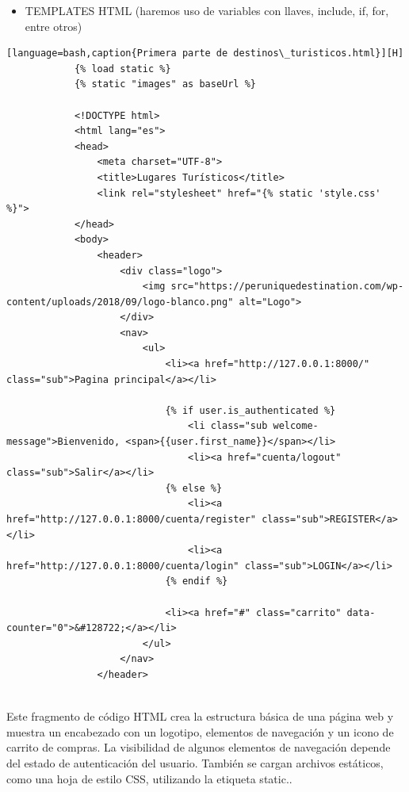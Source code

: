 \documentclass{article}
\begin{document}
        \begin{itemize}	
		\item TEMPLATES HTML (haremos uso de variables con llaves, include, if, for, entre otros)
	\end{itemize}
	\begin{lstlisting}[language=bash,caption{Primera parte de destinos\_turisticos.html}][H]
            {% load static %}
            {% static "images" as baseUrl %}
            
            <!DOCTYPE html>
            <html lang="es">
            <head>
                <meta charset="UTF-8">
                <title>Lugares Turísticos</title>
                <link rel="stylesheet" href="{% static 'style.css' %}">
            </head>
            <body>
                <header>
                    <div class="logo">
                        <img src="https://peruniquedestination.com/wp-content/uploads/2018/09/logo-blanco.png" alt="Logo">
                    </div>
                    <nav>
                        <ul>
                            <li><a href="http://127.0.0.1:8000/" class="sub">Pagina principal</a></li>
            
                            {% if user.is_authenticated %}
                                <li class="sub welcome-message">Bienvenido, <span>{{user.first_name}}</span></li>
                                <li><a href="cuenta/logout" class="sub">Salir</a></li>
                            {% else %}
                                <li><a href="http://127.0.0.1:8000/cuenta/register" class="sub">REGISTER</a></li>
                                <li><a href="http://127.0.0.1:8000/cuenta/login" class="sub">LOGIN</a></li>
                            {% endif %}
            
                            <li><a href="#" class="carrito" data-counter="0">&#128722;</a></li>
                        </ul>
                    </nav>
                </header>
            
	\end{lstlisting}
    Este fragmento de código HTML crea la estructura básica de una página web y muestra un encabezado con un logotipo, elementos de navegación y un icono de carrito de compras. La visibilidad de algunos elementos de navegación depende del estado de autenticación del usuario. También se cargan archivos estáticos, como una hoja de estilo CSS, utilizando la etiqueta static.. 
\end{document}

